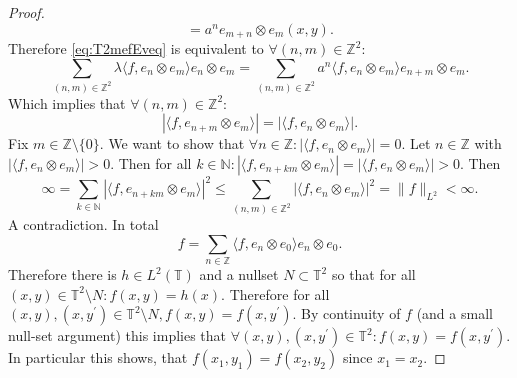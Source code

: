 \begin{proof}
\begin{equation*}
    = a^n e_{m+n} \otimes e_m (x,y).
  \end{equation*}
  Therefore \cref{eq:T2mefEveq} is equivalent to $\forall (n,m) \in \mathbb{Z}^2$:
  \begin{equation*}
    \sum_{(n,m) \in \mathbb{Z}^2} \lambda \langle f, e_n \otimes e_m \rangle e_n \otimes e_m = 
    \sum_{(n,m) \in \mathbb{Z}^2} a^n \langle f, e_n \otimes e_m \rangle e_{n+m} \otimes e_m.
  \end{equation*}
  Which implies that
$\forall (n,m) \in \mathbb{Z}^2$:
\begin{equation*}
  |\langle f, e_{n+m} \otimes e_m \rangle|  = |\langle f, e_n \otimes e_m \rangle|.
\end{equation*}
  Fix $m \in \mathbb{Z} \setminus \{0\}$.
  We want to show that $\forall n \in \mathbb{Z}: |\langle f, e_n \otimes e_m \rangle| = 0$.
  Let $n \in \mathbb{Z}$ with $|\langle f, e_n \otimes e_m \rangle| > 0$.
  Then for all $k \in \mathbb{N}: |\langle f, e_{n+km} \otimes e_m \rangle| = |\langle f, e_n \otimes e_m \rangle|>0$.
  Then
  \begin{equation*}
    \infty = \sum_{k \in \mathbb{N} } |\langle f, e_{n+km} \otimes e_m \rangle|^2
    \leq   \sum_{(n,m) \in \mathbb{Z}^2} |\langle f, e_{n} \otimes e_m \rangle|^2 
    =\|f\|_{L^2} < \infty.
  \end{equation*}
  A contradiction.
  In total
  \begin{equation*}
    f = \sum_{n \in \mathbb{Z}} \langle f, e_n \otimes e_0 \rangle e_n \otimes e_0.
  \end{equation*}
  Therefore there is $h \in L^2(\mathbb{T})$ and a nullset $N \subset \mathbb{T}^2$ so that for all $(x,y) \in \mathbb{T}^2 \setminus N : f(x,y) = h(x)$.
  Therefore for all  $(x,y) , (x,y^\prime) \in \mathbb{T}^2 \setminus N , f(x,y) = f(x,y^\prime)$. 
  By continuity of $f$ (and a small null-set argument) this implies that $\forall (x,y), (x,y^\prime) \in \mathbb{T}^2 : f(x,y) = f(x,y^\prime)$.
  In particular this shows, that $f(x_1,y_1) = f(x_2, y_2)$ since $x_1 = x_2$.
\end{proof}
